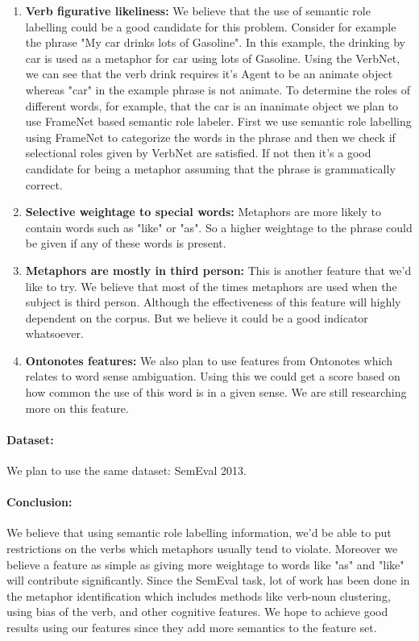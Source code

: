 \documentclass[11pt] {article}
\begin{document}
\begin{enumerate}
\item \textbf {Verb figurative likeliness:} We believe that the use of semantic role labelling could be a good candidate for this problem. Consider for example the phrase "My car drinks lots of Gasoline". In this example, the drinking by car is used as a metaphor for car using lots of Gasoline. Using the VerbNet, we can see that the verb drink requires it's Agent to be an animate object whereas "car" in the example phrase is not animate. To determine the roles of different words, for example, that the car is an inanimate object we plan to use FrameNet based semantic role labeler. First we use semantic role labelling using FrameNet to categorize the words in the phrase and then we check if selectional roles given by VerbNet are satisfied. If not then it's a good candidate for being a metaphor assuming that the phrase is grammatically correct. 

\item \textbf {Selective weightage to special words:} Metaphors are more likely to contain words such as "like" or "as". So a higher weightage to the phrase could be given if any of these words is present.

\item \textbf {Metaphors are mostly in third person:} This is another feature that we'd like to try. We believe that most of the times metaphors are used when the subject is third person. Although the effectiveness of this feature will highly dependent on the corpus. But we believe it could be a good indicator whatsoever.

\item \textbf{Ontonotes features:} We also plan to use features from Ontonotes which relates to word sense ambiguation. Using this we could get a score based on how common the use of this word is in a given sense. We are still researching more on this feature.
 
\end{enumerate}

\paragraph{Dataset:} We plan to use the same dataset: SemEval 2013. 

\paragraph {Conclusion:} We believe that using semantic role labelling information, we'd be able to put restrictions on the verbs which metaphors usually tend to violate. Moreover we believe a feature as simple as giving more weightage to words like "as" and "like" will contribute significantly. Since the SemEval task, lot of work has been done in the metaphor identification which includes methods like verb-noun clustering, using bias of the verb, and other cognitive features. We hope to achieve good results using our features since they add more semantics to the feature set.
\end{document}
